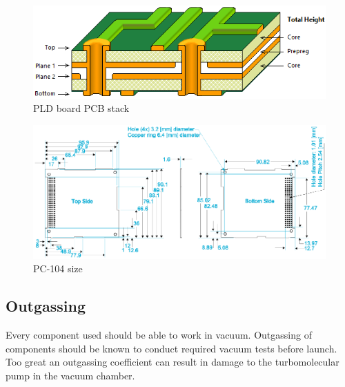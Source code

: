         \begin{figure}[H]
            \centering
            \includegraphics[width=0.5\paperwidth]{img/04/PLD_PCB_stack.png}
            \caption{PLD board PCB stack}
            \label{PLD_PCB_stack}
        \end{figure}

        \begin{figure}[H]
            \centering
            \includegraphics[width=0.7\paperwidth]{img/04/PC104_PLD_size.png}
            \caption{PC-104 size}
            \label{PLD_PCB_size}
        \end{figure}



    \subsection{Outgassing}
        Every component used should be able to work in vacuum. Outgassing of components should be known to conduct required vacuum tests before launch. Too great an outgassing coefficient can result in damage to the turbomolecular pump in the vacuum chamber.

